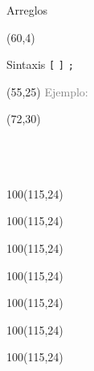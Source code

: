 \documentclass[aspectratio=169]{beamer}
\begin{document}
\begin{frame}[fragile,t]{Arreglos}
    \begin{textblock}{95}(60,4)
    \begin{block}{\small Sintaxis}
    \vspace{0.2cm}
    \scriptsize
     \hspace{0.2cm} 
    {\large \texttt{[}}  {\large \texttt{]}} {\large \texttt{;}}\\
    \end{block}
    \end{textblock}
    \begin{textblock}{87}(55,25)
    \textcolor{gray}{Ejemplo:}
    \end{textblock}
    \begin{textblock}{87}(72,30)
    \\
    \\
    \\
    \\
    \end{textblock}
    \begin{textblock}{100}(115,24)  \end{textblock}
    \begin{textblock}{100}(115,24)  \end{textblock}
    \begin{textblock}{100}(115,24)  \end{textblock}
    \begin{textblock}{100}(115,24)  \end{textblock}
    \begin{textblock}{100}(115,24)  \end{textblock}
    \begin{textblock}{100}(115,24)  \end{textblock}
    \begin{textblock}{100}(115,24)  \end{textblock}

\end{frame}
\end{document}
